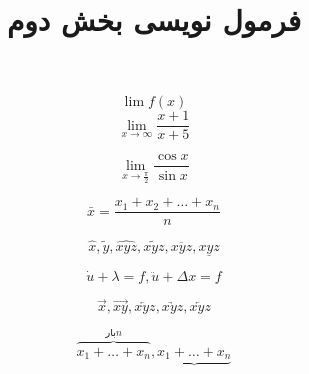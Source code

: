 \documentclass{article}
\title{فرمول نویسی بخش دوم}
\begin{document}
\maketitle
\lr{--------------------------------------------------------------------------------------------}	
	
\[
\lim f(x)
\]
\[
\lim_{x \to \infty} \frac{x+1}{x+5}
\]

\[
\lim_{x \to \frac{\pi}{2}} \frac{\cos x}{\sin x}
\]
	
	
\[
\bar{x}=\frac{x_1+x_2+\dots+x_n}{n}
\]

\[
\hat{x},\tilde{y},\widehat{xyz},\widetilde{xyz} , \overline{xyz}, \underline{xyz}
\]

\[
\dot{u}+\lambda=f, \ddot{u}+\Delta x=f
\]

\[
\vec{x}, \overrightarrow{xy} , \overleftarrow{xyz} , \underrightarrow{xyz}, \underleftarrow{xyz}
\]

\[
\overbrace{x_1+\dots+x_n}^{\text{بار} n},\underbrace{x_1+\dots+x_n}
\]
\end{document}
